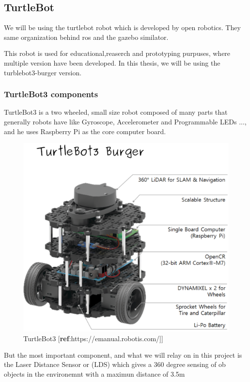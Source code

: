 \documentclass[12pt]{extarticle}
\begin{document}
\subsection{TurtleBot}
We will be using the turtlebot robot which is developed by open robotics. They same organization behind ros and the gazebo similator.

This robot is used for educational,reaserch and prototyping purpuses, where multiple version have been developed. In this thesis, we will be using the turblebot3-burger version.

\subsubsection{TurtleBot3 components}
TurtleBot3 is a two wheeled, small size robot composed of many parts that generally robots have like  Gyroscope, Accelerometer and Programmable LEDs ..., and he uses Raspberry Pi as the core computer board.
 \begin{figure}[h]  
\centering
\includegraphics[scale=0.4]{turtlebot3_burger_components.png}
\caption[TurtleBot3]{TurtleBot3 [\textbf{ref}:https://emanual.robotis.com/]]}
\end{figure}


But the most important component, and what we will relay on in this project is the Laser Distance Sensor or (LDS) which gives a 360 degree sensing of ob objects  in the environemnt with a maximun distance of 3.5m
\end{document}
